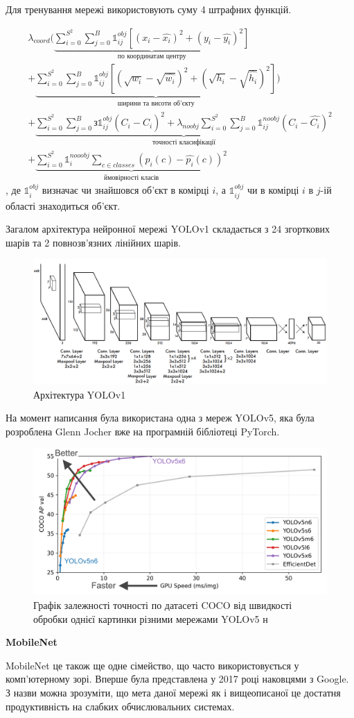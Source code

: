 Для тренування мережі використовують суму 4 штрафних функцій.

\begin{multline}
    \lambda_{coord}(
        \underbrace{ \sum_{i=0}^{S^2} \sum_{j=0}^{B} 
            \mathbb{1}_{ij}^{obj} [(x_i - \widehat{x_i})^2 + (y_i - \widehat{y_i})^2]
        }_\textrm{по координатам центру}\\
        +
        \underbrace{
        \sum_{i=0}^{S^2} \sum_{j=0}^{B} 
                \mathbb{1}_{ij}^{obj} [(\sqrt{w_i} - \sqrt{\widehat{w_i}})^2 + (\sqrt{h_i} - \sqrt{\widehat{h_i}})^2]
        }_\textrm{ширини та висоти об'єкту}
    )\\
    +  \underbrace{
        \sum_{i=0}^{S^2} \sum_{j=0}^{B} з
            \mathbb{1}_{ij}^{obj} (C_i - \widehat{C_i})^2
        +
        \lambda_{noobj} \sum_{i=0}^{S^2} \sum_{j=0}^{B} \mathbb{1}_{ij}^{noobj} (C_i - \widehat{C_i})^2 
        }_\textrm{точності класифікації}\\
    +  \underbrace{
        \sum_{i=0}^{S^2} \mathbb{1}_{i}^{nooobj}\sum_{c \in classes}(p_i(c) -  \widehat{p_i}(c))^2
        }_\textrm{ймовірності класів}
    \label{eq:cnn:yolo_loss}
\end{multline}
, де $\mathbb{1}_{i}^{obj}$ визначає чи знайшовся об'єкт в комірці $i$, а  
$\mathbb{1}_{ij}^{obj}$ чи в комірці $i$ в $j$-ій області знаходиться об'єкт.  

Загалом архітектура нейронної мережі YOLOv1 складається з 24 згорткових шарів та
2 повнозв'язних лінійних шарів.

\begin{figure}[H]
    \includegraphics[width=0.8\linewidth]{images/cnn_yolo2}
    \centering
    \caption{Архітектура YOLOv1 \cite{RedmonYolo}
    }
\end{figure}

На момент написання була використана одна з мереж YOLOv5, яка була
розроблена Glenn Jocher вже на програмній бібліотеці PyTorch.

\begin{figure}[H]
    \includegraphics[width=0.5\linewidth]{images/cnn_yolo3}
    \centering
    \caption{Графік залежності точності  по датасеті COCO від швидкості обробки однієї 
    картинки різними мережами YOLOv5 н
    }
\end{figure}

\textbf{MobileNet}

MobileNet це також ще одне сімейство, що часто використовується у комп'ютерному зорі.
Вперше була представлена у 2017 році наковцями з Google.
З назви можна зрозуміти, що мета даної мережі як і вищеописаної це достатня продуктивність
на слабких обчислювальних системах.